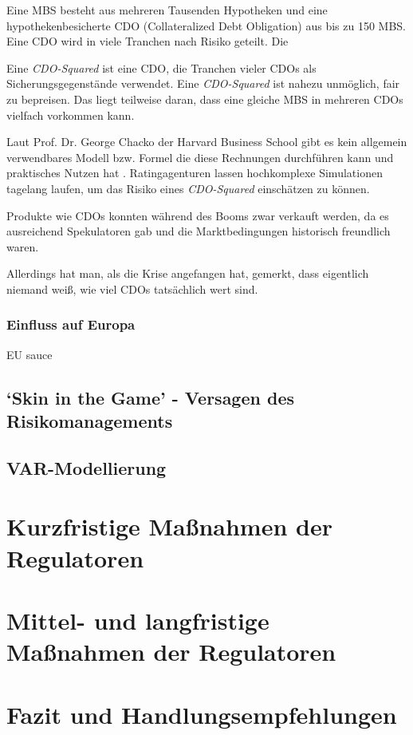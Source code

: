 \documentclass[a4paper,draft,11pt]{report}
\begin{document}
Eine MBS besteht aus mehreren Tausenden Hypotheken
und eine hypothekenbesicherte CDO (Collateralized Debt 
Obligation) aus bis zu 150 MBS. Eine CDO wird in viele
Tranchen nach Risiko geteilt. Die 

Eine \textit{CDO-Squared}
ist eine CDO, die Tranchen vieler CDOs als Sicherungsgegenst\"ande verwendet.
Eine \textit{CDO-Squared} ist nahezu unm\"oglich, fair zu bepreisen. Das liegt teilweise
daran, dass eine gleiche MBS in mehreren CDOs vielfach vorkommen kann.

Laut Prof. Dr. George Chacko der Harvard Business School gibt es kein
allgemein verwendbares Modell bzw. Formel die diese Rechnungen durchf\"uhren kann
und praktisches Nutzen hat \parencite[226]{chackocred}. Ratingagenturen lassen
hochkomplexe Simulationen tagelang laufen, um das Risiko eines \textit{CDO-Squared}
einsch\"atzen zu k\"onnen.

Produkte wie CDOs konnten w\"ahrend des Booms zwar verkauft werden, da  
es ausreichend Spekulatoren gab und die Marktbedingungen historisch freundlich waren.

Allerdings hat man, als die Krise angefangen hat, gemerkt, dass eigentlich niemand weiß,
wie viel CDOs tats\"achlich wert sind.

\subsection{Einfluss auf Europa}
EU sauce
\section{\foreignquote*{english}{Skin in the Game} - Versagen des Risikomanagements}
\section{VAR-Modellierung}
\chapter{Kurzfristige Maßnahmen der Regulatoren}

\chapter{Mittel- und langfristige Maßnahmen der Regulatoren}

\chapter{Fazit und Handlungsempfehlungen}
\nocite{gs1}

\newpage
\printbibliography[
  heading=bibintoc,
  title={Literaturverzeichnis}
  ]
\end{document}
